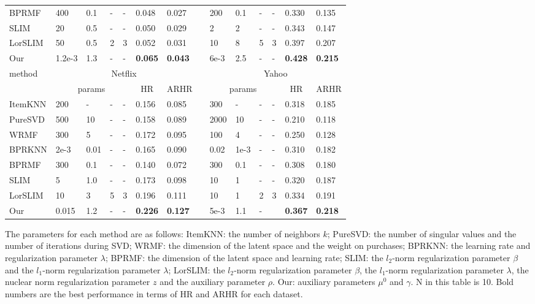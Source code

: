 \documentclass[letterpaper]{article}
\begin{document}
\begin{table}[ht]
\begin{center}
\begin{threeparttable}
\begin{tabular}{llllllllllllll}
BPRMF&400&0.1&-&-&0.048&0.027&&200&0.1&-&-&0.330&0.135\\
SLIM&20&0.5&-&-&0.050&0.029&&2&2&-&-&0.343&0.147\\
LorSLIM&50&0.5&2&3&0.052&0.031&&10&8&5&3&0.397&0.207\\
Our&1.2e-3&1.3&-&-&\bf{0.065}&\bf{0.043}&&6e-3&2.5&-&-&\bf{0.428}&\bf{0.215}\\
\hline\hline
\multirow{2}{*}{method} &
\multicolumn{6}{c}{Netflix} &
\multicolumn{1}{c}{}&
\multicolumn{6}{c}{Yahoo} \\
\cline{2-7} \cline{9-14}
  & \multicolumn{4}{c}{params} &\multicolumn{1}{c}{HR}  & \multicolumn{1}{c}{ARHR} &\multicolumn{1}{c}{}&\multicolumn{4}{c}{params} &\multicolumn{1}{c}{HR}  & \multicolumn{1}{c}{ARHR} \\
\hline
ItemKNN&200&-&-&-&0.156&0.085&&300&-&-&-&0.318&0.185\\
PureSVD&500&10&-&-&0.158&0.089&&2000&10&-&-&0.210&0.118\\
WRMF&300&5&-&-&0.172&0.095&&100&4&-&-&0.250&0.128\\
BPRKNN&2e-3&0.01&-&-&0.165&0.090&&0.02&1e-3&-&-&0.310&0.182\\
BPRMF&300&0.1&-&-&0.140&0.072&&300&0.1&-&-&0.308&0.180\\
SLIM&5&1.0&-&-&0.173&0.098&&10&1&-&-&0.320&0.187\\
LorSLIM&10&3&5&3&0.196&0.111&&10&1&2&3&0.334&0.191\\
Our&0.015&1.2&-&-&\bf{0.226}&\bf{0.127}&&5e-3&1.1&-&&\bf{0.367}&\bf{0.218}\\
\hline
\end{tabular}%
%

   \begin{tablenotes}


      \item The parameters for each method are as follows: ItemKNN: the number of neighbors $k$; PureSVD: the number of singular values and the number of iterations during SVD; WRMF: the dimension of the latent space and the weight on purchases; BPRKNN: the learning rate and regularization parameter $\lambda$; BPRMF: the dimension of the latent space and learning rate; SLIM: the $l_2$-norm regularization parameter $\beta$ and the $l_1$-norm regularization parameter
$\lambda$; LorSLIM: the $l_2$-norm regularization parameter $\beta$, the $l_1$-norm regularization parameter $\lambda$, the nuclear norm regularization parameter $z$ and the auxiliary parameter $\rho$. Our: auxiliary parameters $\mu^0$ and $\gamma$. N in this table is 10. Bold numbers are the best performance in terms of HR and ARHR for each dataset.

 \end{tablenotes}
\end{threeparttable}
\end{center}
\end{table}
\end{document}
